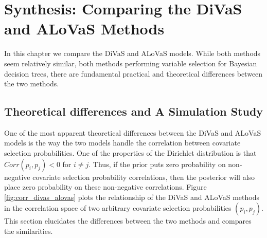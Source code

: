 \chapter{Synthesis: Comparing the DiVaS and ALoVaS Methods}
In this chapter we compare the DiVaS and ALoVaS models. While both methods seem relatively similar, both methods performing variable selection for Bayesian decision trees, there are fundamental practical and theoretical differences between the two methods. 

\section{Theoretical differences and A Simulation Study}

One of the most apparent theoretical differences between the DiVaS and ALoVaS models is the way the two models handle the correlation between covariate selection probabilities. One of the properties of the Dirichlet distribution is that $Corr(p_i,p_j) < 0$ for $i\neq j$. Thus, if the prior puts zero probability on non-negative covariate selection probability correlations, then the posterior will also place zero probability on these non-negative correlations. Figure \ref{fig:corr_divas_alovas} plots the relationship of the DiVaS and ALoVaS methods in the correlation space of two arbitrary covariate selection probabilities $(p_i,p_j)$. This section elucidates the differences between the two methods and compares the similarities. 



